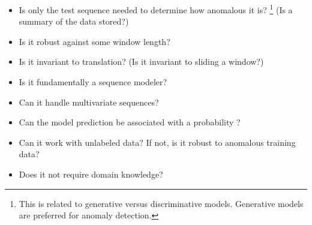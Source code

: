 \begin{itemize}

\item Is only the test sequence needed to determine how anomalous it is?%
\footnote{This is related to generative versus discriminative models. Generative models are preferred for anomaly detection.}
(Is a summary of the data stored?)

\item Is it robust against some window length?

\item Is it invariant to translation? (Is it invariant to sliding a window?)

\item Is it fundamentally a sequence modeler?

\item Can it handle multivariate sequences?

\item Can the model prediction be associated with a probability \cite{Graves2013b}?

\item Can it work with unlabeled data? If not, is it robust to anomalous training data?

\item Does it not require domain knowledge?

\end{itemize}


